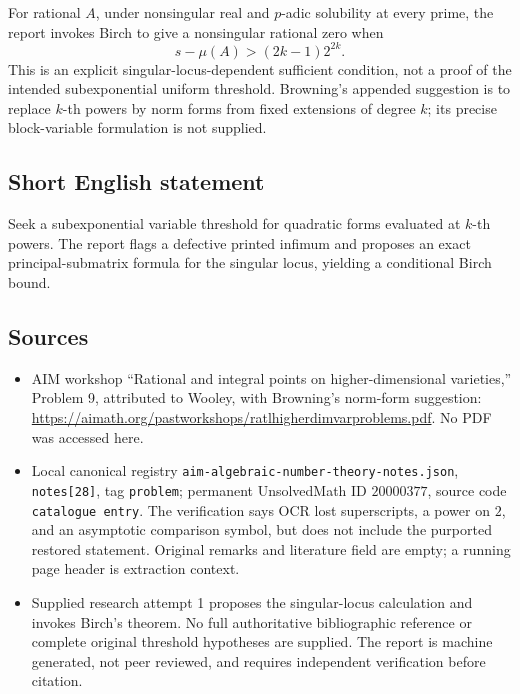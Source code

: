 \documentclass[11pt]{article}
\begin{document}
For rational \(A\), under nonsingular real and \(p\)-adic solubility at every prime, the report invokes Birch to give a nonsingular rational zero when
\[
s-\mu(A)>(2k-1)2^{2k}.
\]
This is an explicit singular-locus-dependent sufficient condition, not a proof of the intended subexponential uniform threshold. Browning's appended suggestion is to replace \(k\)-th powers by norm forms from fixed extensions of degree \(k\); its precise block-variable formulation is not supplied.
\subsection{Short English statement}
Seek a subexponential variable threshold for quadratic forms evaluated at \(k\)-th powers. The report flags a defective printed infimum and proposes an exact principal-submatrix formula for the singular locus, yielding a conditional Birch bound.
\subsection{Sources}
\begin{itemize}
\item AIM workshop ``Rational and integral points on higher-dimensional varieties,'' Problem 9, attributed to Wooley, with Browning's norm-form suggestion: \url{https://aimath.org/pastworkshops/ratlhigherdimvarproblems.pdf}. No PDF was accessed here.
\item Local canonical registry \texttt{aim-algebraic-number-theory-notes.json}, \texttt{notes[28]}, tag \texttt{problem}; permanent UnsolvedMath ID \(20000377\), source code \texttt{catalogue entry}. The verification says OCR lost superscripts, a power on \(2\), and an asymptotic comparison symbol, but does not include the purported restored statement. Original remarks and literature field are empty; a running page header is extraction context.
\item Supplied research attempt 1 proposes the singular-locus calculation and invokes Birch's theorem. No full authoritative bibliographic reference or complete original threshold hypotheses are supplied. The report is machine generated, not peer reviewed, and requires independent verification before citation.
\end{itemize}
\end{document}

